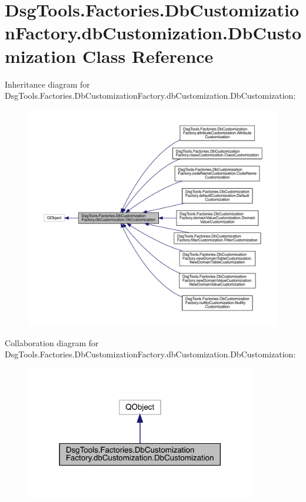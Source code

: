 \hypertarget{class_dsg_tools_1_1_factories_1_1_db_customization_factory_1_1db_customization_1_1_db_customization}{}\section{Dsg\+Tools.\+Factories.\+Db\+Customization\+Factory.\+db\+Customization.\+Db\+Customization Class Reference}
\label{class_dsg_tools_1_1_factories_1_1_db_customization_factory_1_1db_customization_1_1_db_customization}


Inheritance diagram for Dsg\+Tools.\+Factories.\+Db\+Customization\+Factory.\+db\+Customization.\+Db\+Customization\+:
\nopagebreak
\begin{figure}[H]
\begin{center}
\leavevmode
\includegraphics[width=350pt]{class_dsg_tools_1_1_factories_1_1_db_customization_factory_1_1db_customization_1_1_db_customization__inherit__graph}
\end{center}
\end{figure}


Collaboration diagram for Dsg\+Tools.\+Factories.\+Db\+Customization\+Factory.\+db\+Customization.\+Db\+Customization\+:
\nopagebreak
\begin{figure}[H]
\begin{center}
\leavevmode
\includegraphics[width=285pt]{class_dsg_tools_1_1_factories_1_1_db_customization_factory_1_1db_customization_1_1_db_customization__coll__graph}
\end{center}
\end{figure}
